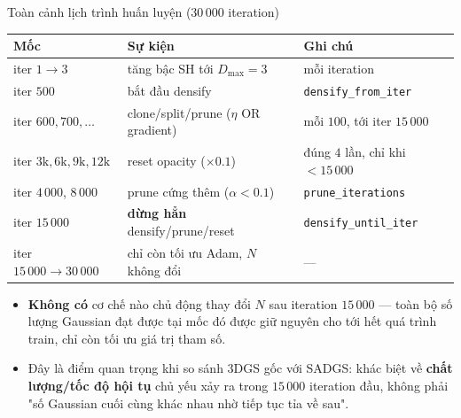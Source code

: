 
\begin{frame}{Toàn cảnh lịch trình huấn luyện ($30\,000$ iteration)}
\scriptsize
\begin{center}
\begin{tabular}{lll}
\toprule
\textbf{Mốc} & \textbf{Sự kiện} & \textbf{Ghi chú}\\
\midrule
iter $1\to3$ & tăng bậc SH tới $D_{\max}=3$ & mỗi iteration\\
iter $500$ & bắt đầu densify & \texttt{densify\_from\_iter}\\
iter $600,700,\dots$ & clone/split/prune ($\eta$ OR gradient) & mỗi $100$, tới iter $15\,000$\\
iter $3\text{k},6\text{k},9\text{k},12\text{k}$ & reset opacity ($\times0.1$) & đúng $4$ lần, chỉ khi $<15\,000$\\
iter $4\,000$, $8\,000$ & prune cứng thêm ($\alpha<0.1$) & \texttt{prune\_iterations}\\
iter $15\,000$ & \textbf{dừng hẳn} densify/prune/reset & \texttt{densify\_until\_iter}\\
iter $15\,000\to30\,000$ & chỉ còn tối ưu Adam, $N$ không đổi & ---\\
\bottomrule
\end{tabular}
\end{center}
\begin{itemize}\itemsep1pt
    \item \textbf{Không có} cơ chế nào chủ động thay đổi $N$ sau iteration $15\,000$ --- toàn bộ số lượng Gaussian đạt
    được tại mốc đó được giữ nguyên cho tới hết quá trình train, chỉ còn tối ưu giá trị tham số.
    \item Đây là điểm quan trọng khi so sánh 3DGS gốc với SADGS: khác biệt về \textbf{chất lượng/tốc độ hội tụ} chủ yếu
    xảy ra trong $15\,000$ iteration đầu, không phải "số Gaussian cuối cùng khác nhau nhờ tiếp tục tỉa về sau".
\end{itemize}
\end{frame}


